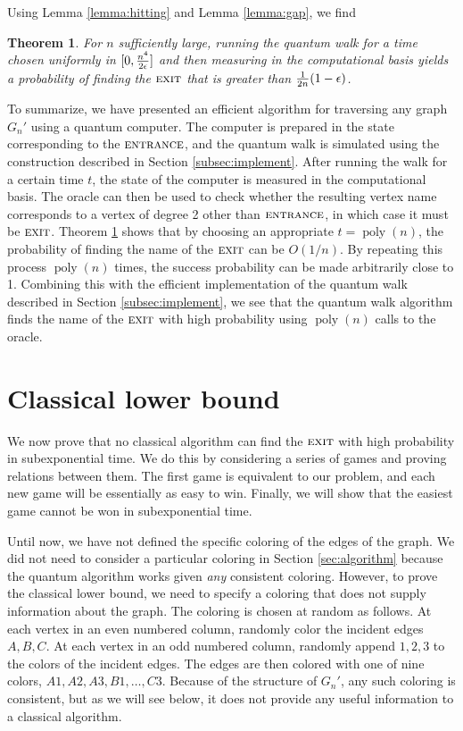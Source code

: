 \documentclass[aps,11pt,twoside,nofootinbib,tightenlines,superscriptaddress,preprintnumbers]{revtex4}
\newcommand{\<}{\langle}
\renewcommand{\>}{\rangle}
\newcommand{\ent}{{\textsc{entrance}}}
\newcommand{\exit}{{\textsc{exit}}}
\newcommand{\poly}{\mathop{\mathrm{poly}}\nolimits}
\newtheorem{theorem}{Theorem}
\begin{document}
Using Lemma \ref{lemma:hitting} and Lemma \ref{lemma:gap}, we find
%
\begin{theorem}
For $n$ sufficiently large, running the quantum walk for a time chosen
uniformly in $[0,{n^4 \over 2\epsilon}]$ and then measuring in the
computational basis yields a probability of finding the $\exit$ that is
greater than ${1 \over 2n} (1-\epsilon)$.
\label{thm:hitting}
\end{theorem}

To summarize, we have presented an efficient algorithm for traversing any
graph $G_n'$ using a quantum computer.  The computer is prepared in the
state corresponding to the $\ent$, and the quantum walk is simulated using
the construction described in Section \ref{subsec:implement}.  After
running the walk for a certain time $t$, the state of the computer is
measured in the computational basis.  The oracle can then be used to check
whether the resulting vertex name corresponds to a vertex of degree 2
other than $\ent$, in which case it must be $\exit$.  Theorem
\ref{thm:hitting} shows that by choosing an appropriate $t=\poly(n)$, the
probability of finding the name of the $\exit$ can be $O(1/n)$.  By
repeating this process $\poly(n)$ times, the success probability can be
made arbitrarily close to 1.  Combining this with the efficient
implementation of the quantum walk described in Section
\ref{subsec:implement}, we see that the quantum walk algorithm finds the
name of the $\exit$ with high probability using $\poly(n)$ calls to the
oracle.  

\section{Classical lower bound}\label{sec:lowerbound}

We now prove that no classical algorithm can find the $\exit$ with high
probability in subexponential time.  We do this by considering a series of
games and proving relations between them.  The first game is equivalent to
our problem, and each new game will be essentially as easy to win.
Finally, we will show that the easiest game cannot be won in
subexponential time.

Until now, we have not defined the specific coloring of the edges of the
graph.  We did not need to consider a particular coloring in Section
\ref{sec:algorithm} because the quantum algorithm works given {\em any}
consistent coloring.  However, to prove the classical lower bound, we need
to specify a coloring that does not supply information about the graph.
The coloring is chosen at random as follows.  At each vertex in an even
numbered column, randomly color the incident edges $A,B,C$.  At each
vertex in an odd numbered column, randomly append $1,2,3$ to the colors of
the incident edges.  The edges are then colored with one of nine colors,
$A1,A2,A3,B1,\ldots,C3$.  Because of the structure of $G_n'$, any such
coloring is consistent, but as we will see below, it does not provide any
useful information to a classical algorithm.
\end{document}
